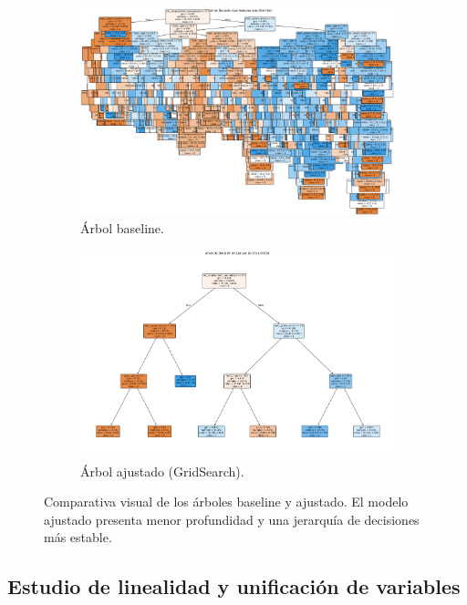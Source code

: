 \begin{figure}[h]
  \centering
  \begin{subfigure}[t]{0.48\linewidth}
    \centering
    \includegraphics[width=\linewidth]{figures/decision_tree_baseline.png}
    \caption{Árbol baseline.}
  \end{subfigure}\hfill
  \begin{subfigure}[t]{0.48\linewidth}
    \centering
    \includegraphics[width=\linewidth]{figures/decision_tree_tuned.png}
    \caption{Árbol ajustado (GridSearch).}
  \end{subfigure}
  \caption{Comparativa visual de los árboles baseline y ajustado. El modelo ajustado presenta menor profundidad y una jerarquía de decisiones más estable.}
\end{figure}

\subsection{Estudio de linealidad y unificación de variables}

